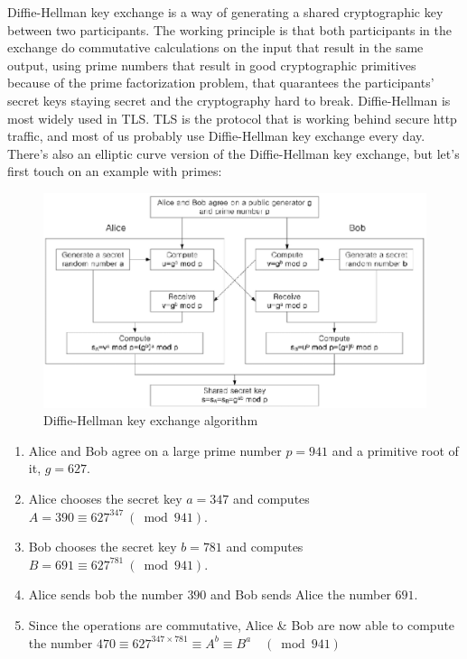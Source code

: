 Diffie-Hellman key exchange is a way of generating a shared cryptographic key between two participants. The working principle is that both participants in the exchange do commutative calculations on the input that result in the same output, using prime numbers that result in good cryptographic primitives because of the prime factorization problem, that quarantees the participants' secret keys staying secret and the cryptography hard to break. Diffie-Hellman is most widely used in TLS. TLS is the protocol that is working behind secure http traffic, and most of us probably use Diffie-Hellman key exchange every day. There's also an elliptic curve version of the Diffie-Hellman key exchange, but let's first touch on an example with primes:

\begin{figure}
	\includegraphics[width=\textwidth]{pictures/diffiehellman.eps}
	\caption{Diffie-Hellman key exchange algorithm\cite{Jeon2014-ag}}
	\label{Diagram, Diffie-Hellman Key Exchange}
\end{figure}

\begin{enumerate}
  \item Alice and Bob agree on a large prime number $p = 941$ and a primitive root of it, $g = 627$.
  \item Alice chooses the secret key $a = 347$ and computes
    \(A = 390 \equiv 627^{347} \ (\bmod 941).\)
  \item Bob chooses the secret key $b = 781$ and computes
    \(B = 691 \equiv 627^{781} \ (\bmod 941).\)
  \item Alice sends bob the number $390$ and Bob sends Alice the number $691$.
  \item Since the operations are commutative, Alice & Bob are now able to compute the number
    \(470 \equiv 627^{347 \times 781} \equiv A^b \equiv B^a \quad (\bmod 941)\)
\end{enumerate}

